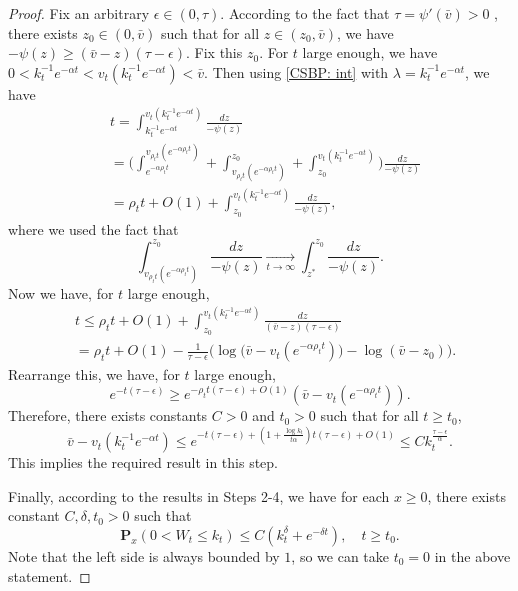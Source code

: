 \documentclass[12pt,a4paper]{amsart}
\theoremstyle{plain}
\theoremstyle{definition}
\numberwithin{equation}{section}
\begin{document}
\begin{proof}
    Fix an arbitrary $\epsilon \in (0,\tau)$.
    According to the fact that $\tau=\psi'(\bar v)>0$ , there exists $z_0 \in (0,\bar v)$ such that for all $z\in (z_0, \bar v)$, we have $-\psi(z)\geq (\bar v - z)(\tau- \epsilon)$.     Fix this $z_0$.
    For $t$ large enough, we have $0<k_t^{-1}e^{-\alpha t} < v_t(k_t^{-1}e^{-\alpha t})< \bar v$. Then  using \eqref{CSBP: int} with $\lambda=k_t^{-1} e^{-\alpha t}$, we have
\begin{equation}\begin{split}
    &t =\int^{v_t(k_t^{-1} e^{-\alpha t})}_{k_t^{-1} e^{-\alpha t}}\frac{dz}{-\psi(z)}
    \\&= \Big(\int^{v_{\rho_t t}(e^{-\alpha \rho_t t})}_{e^{-\alpha \rho_t t}}  + \int^{z_0}_{v_{\rho_t t}(e^{-\alpha \rho_t t})} +\int^{v_t(k_t^{-1}e^{-\alpha  t})}_{z_0}\Big)\frac{dz}{-\psi(z)}
     \\&= \rho_t t + O(1) +\int^{v_t(k_t^{-1}e^{-\alpha t})}_{z_0} \frac{dz}{-\psi(z)},
\end{split}\end{equation}
    where we used the fact that
\[
    \int_{v_{\rho_t t}(e^{-\alpha \rho_tt})}^{z_0} \frac{dz}{-\psi(z)} \xrightarrow[t\to \infty] {}\int_{z^*}^{z_0} \frac{dz}{-\psi(z)}.
\]
    Now we have, for $t$ large enough,
\begin{equation}\begin{split}
    &t\leq  \rho_t t + O(1)+ \int_{z_0}^{v_t(k_t^{-1}e^{-\alpha t})} \frac{dz}{(\bar v-z)(\tau - \epsilon)}
    \\&=  \rho_t t +O(1)- \frac{1}{\tau-\epsilon}\Big( \log \big(\bar v-v_t(e^{-\alpha \rho_t t})\big) - \log(\bar v-z_0)\Big).
\end{split}\end{equation}
    Rearrange this, we have, for $t$ large enough,
\[
    e^{-t(\tau - \epsilon)} \geq e^{-\rho_t t(\tau - \epsilon)+O(1)}(\bar v - v_t(e^{-\alpha \rho_t t})).
\]
    Therefore, there exists constants $C>0$ and $t_0>0$ such that for all $t\geq t_0$,
\[
    \bar v - v_t(k_t^{-1} e^{-\alpha t}) \leq e^{-t(\tau -\epsilon)+ (1+\frac{\log k_t}{t\alpha})t(\tau - \epsilon)+O(1)}
    \leq Ck_t^{\frac{\tau - \epsilon}{\alpha}}.
\]
    This implies the required result in this step.

    Finally, according to the results in Steps 2-4, we have for each $x\geq 0$, there exists constant $C, \delta, t_0 > 0$ such that
\[
    \mathbf P_{x}(0< W_t\leq k_t) \leq C(k_t^{\delta}+e^{-\delta t}),\quad t\geq t_0.
\]
Note that the left side is always bounded by $1$, so we can take $t_0 =0$ in the above statement.
\end{proof}
\end{document}
